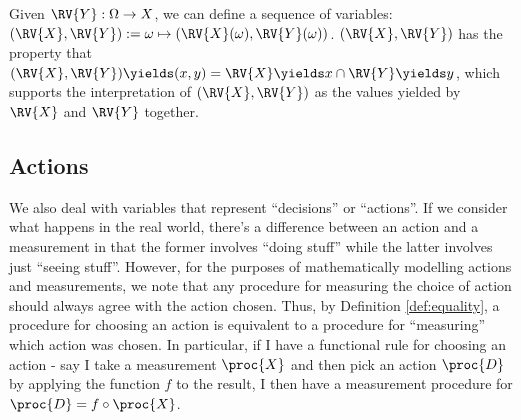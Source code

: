 Given $\RV{Y}:\Omega\to X$, we can define a sequence of variables: $(\RV{X},\RV{Y}):=\omega\mapsto (\RV{X}(\omega),\RV{Y}(\omega))$. $(\RV{X},\RV{Y})$ has the property that $(\RV{X},\RV{Y})\yields (x,y)= \RV{X}\yields x\cap \RV{Y}\yields y$, which supports the interpretation of $(\RV{X},\RV{Y})$ as the values yielded by $\RV{X}$ and $\RV{Y}$ together.

\subsection{Actions}

We also deal with variables that represent ``decisions'' or ``actions''. If we consider what happens in the real world, there's a difference between an action and a measurement in that the former involves ``doing stuff'' while the latter involves just ``seeing stuff''. However, for the purposes of mathematically modelling actions and measurements, we note that any procedure for measuring the choice of action should always agree with the action chosen. Thus, by Definition \ref{def:equality}, a procedure for choosing an action is equivalent to a procedure for ``measuring'' which action was chosen. In particular, if I have a functional rule for choosing an action - say I take a measurement $\proc{X}$ and then pick an action $\proc{D}$ by applying the function $f$ to the result, I then have a measurement procedure for $\proc{D}=f\circ \proc{X}$.